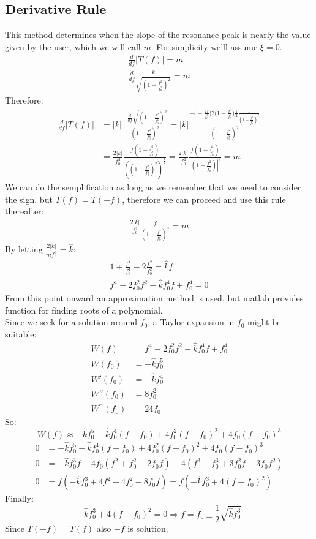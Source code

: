 \documentclass[10pt,a4paper,final]{report}
\begin{document}
\subsection{Derivative Rule}
This method determines when the slope of the resonance peak is nearly the value given by the user, which we will call $m$.
For simplicity we'll assume $\xi = 0.$
\begin{gather*}
\frac{d}{df} |T(f)| = m \\
\frac{d}{df} \frac{|k|}{\sqrt{(1-\frac{f^2}{f_0^2})^2}} = m
\end{gather*}
Therefore:
\begin{align*}
\frac{d}{df} |T(f)| &= |k| \frac{-\frac{d}{df} {\sqrt{(1-\frac{f^2}{f_0^2})^2}}}{(1-\frac{f^2}{f_0^2})^2} =
|k| \frac{-\big(-\frac{2f}{f_0^2}\big)2\big(1-\frac{f^2}{f_0^2}\big)\frac{1}{2}\frac{1}{(1-\frac{f^2}{f_0^2})^2}}{(1-\frac{f^2}{f_0^2})^2}
\\
&= \frac{2|k|}{f_0^2} \frac{f(1-\frac{f^2}{f_0^2})}{((1-\frac{f^2}{f_0^2})^2)^{\frac{3}{2}}}=\frac{2|k|}{f_0^2} \frac{f(1-\frac{f^2}{f_0^2})}{|(1-\frac{f^2}{f_0^2})|^3}=m
\end{align*}
We can do the semplification as long as we remember that we need to consider the sign, but $T(f)=T(-f)$, therefore we can proceed and use this rule thereafter:
\begin{align*}
\frac{2|k|}{f_0^2} \frac{f}{(1-\frac{f^2}{f_0^2})^2}=m
\end{align*}
By letting $\frac{2|k|}{mf_0^2} = \hat{k}$:
\begin{align*}
 1+\frac{f^4}{f_0^4}-2\frac{f^2}{f_0^2} = \hat{k}f \\ f^4-2f_0^2f^2-\hat{k}f_0^4 f+f_0^4=0
\end{align*}
From this point onward an approximation method is used, but matlab provides function for finding roots of a polynomial.
\\
Since we seek for a solution around $f_0$, a Taylor expansion in $f_0$ might be suitable:
\begin{align*}
W(f) &= f^4-2f_0^2f^2-\hat{k}f_0^4 f+f_0^4 \\
W(f_0) &= -\hat{k}f_0^5 \\
W'(f_0) &= -\hat{k}f_0^4 \\
W''(f_0) &=8f_0^2 \\
W^{'''}(f_0) &=24f_0
\end{align*}
So:
$$
W(f) \approx -\hat{k}f_0^5 -\hat{k}f_0^4(f-f_0)+4f_0^2(f-f_0)^2+4f_0(f-f_0)^3
$$
\begin{align*}
0&=-\hat{k}f_0^5 -\hat{k}f_0^4(f-f_0)+4f_0^2(f-f_0)^2+4f_0(f-f_0)^3 \\
0&= -\hat{k}f_0^3f +4f_0(f^2+f_0^2-2f_0f)+4(f^3-f_0^3+3f_0^2f-3f_0f^2) \\
0&= f(-\hat{k}f_0^3 +4f^2+4f_0^2-8f_0f) = f(-\hat{k}f_0^3 +4(f-f_0)^2)
\end{align*}
Finally:
$$-\hat{k}f_0^3 +4(f-f_0)^2 = 0 \Rightarrow f = f_0\pm \frac{1}{2} \sqrt{\hat{k}f_0^3}$$
Since $T(-f)=T(f)$ also $-f$ is solution.
\newpage
\end{document}
